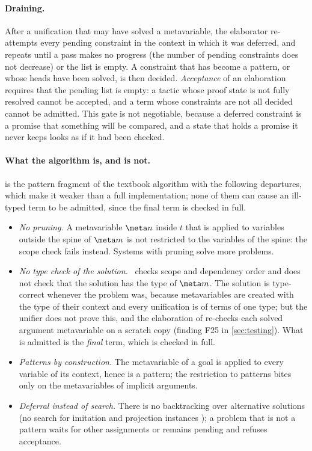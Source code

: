 \paragraph{Draining.}
After a unification that may have solved a metavariable, the elaborator re-attempts every pending constraint in the context in which it was deferred, and repeats until a pass makes no progress (the number of pending constraints does not decrease) or the list is empty.
A constraint that has become a pattern, or whose heads have been solved, is then decided.
\emph{Acceptance} of an elaboration requires that the pending list is empty: a tactic whose proof state is not fully resolved cannot be accepted, and a term whose constraints are not all decided cannot be admitted.
This gate is not negotiable, because a deferred constraint is a promise that something will be compared, and a state that holds a promise it never keeps looks as if it had been checked.

\paragraph{What the algorithm is, and is not.}
 is the pattern fragment of the textbook algorithm with the following departures, which make it weaker than a full implementation; none of them can cause an ill-typed term to be admitted, since the final term is checked in full.
\begin{itemize}
\item \emph{No pruning.} A metavariable $\meta n$ inside $t$ that is applied to variables outside the spine of $\meta m$ is not restricted to the variables of the spine: the scope check fails instead.
  Systems with pruning \citep{abel11,ziliani15} solve more problems.
\item \emph{No type check of the solution.} \Solve\ checks scope and dependency order and does not check that the solution has the type of $\meta m$.
  The solution is type-correct whenever the problem was, because metavariables are created with the type of their context and every unification is of terms of one type; but the unifier does not prove this, and the elaboration of  re-checks each solved argument metavariable on a scratch copy (finding F25 in \cref{sec:testing}).
  What is admitted is the \emph{final} term, which is checked in full.
\item \emph{Patterns by construction.} The metavariable of a goal is applied to every variable of its context, hence is a pattern; the restriction to patterns bites only on the metavariables of implicit arguments.
\item \emph{Deferral instead of search.} There is no backtracking over alternative solutions (no search for imitation and projection instances \citep{huet75}); a problem that is not a pattern waits for other assignments or remains pending and refuses acceptance.
\end{itemize}

